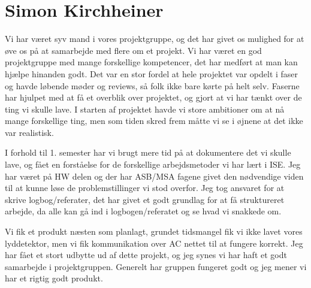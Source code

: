 \section{Simon Kirchheiner}
Vi har været syv mand i vores projektgruppe, og det har givet os mulighed for at øve os på at samarbejde med flere om et projekt. Vi har været en god projektgruppe med mange forskellige kompetencer, det har medført at man kan hjælpe hinanden godt. Det var en stor fordel at hele projektet var opdelt i faser og havde løbende møder og reviews, så folk ikke bare kørte på helt selv. Faserne har hjulpet med at få et overblik over projektet, og gjort at vi har tænkt over de ting vi skulle lave. I starten af projektet havde vi store ambitioner om at nå mange forskellige ting, men som tiden skred frem måtte vi se i øjnene at det ikke var realistisk. 

I forhold til 1. semester har vi brugt mere tid på at dokumentere det vi skulle lave, og fået en forståelse for de forskellige arbejdsmetoder vi har lært i ISE. Jeg har været på HW delen og der har ASB/MSA fagene givet den nødvendige viden til at kunne løse de problemstillinger vi stod overfor. Jeg tog ansvaret for at skrive logbog/referater, det har givet et godt grundlag for at få struktureret arbejde, da alle kan gå ind i logbogen/referatet og se hvad vi snakkede om.

Vi fik et produkt næsten som planlagt, grundet tidsmangel fik vi ikke lavet vores lyddetektor, men vi fik kommunikation over AC nettet til at fungere korrekt. Jeg har fået et stort udbytte ud af dette projekt, og jeg synes vi har haft et godt samarbejde i projektgruppen. Generelt har gruppen fungeret godt og jeg mener vi har et rigtig godt produkt.
